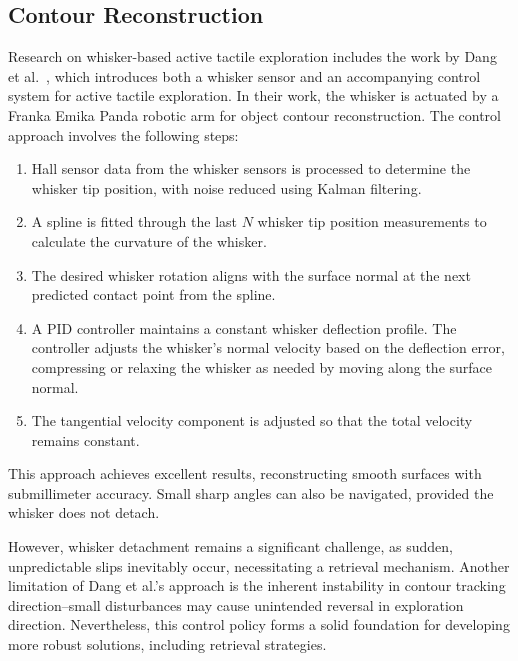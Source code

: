 \subsection{Contour Reconstruction}
Research on whisker-based active tactile exploration includes the work by Dang et al.~\cite{dang2025whisker}, which introduces both a whisker sensor and an accompanying control system for active tactile exploration.
In their work, the whisker is actuated by a Franka Emika Panda robotic arm for object contour reconstruction.
The control approach involves the following steps:
\begin{enumerate}
    \item Hall sensor data from the whisker sensors is processed to determine the whisker tip position, with noise reduced using Kalman filtering.
    \item A spline is fitted through the last $N$ whisker tip position measurements to calculate the curvature of the whisker.
    \item The desired whisker rotation aligns with the surface normal at the next predicted contact point from the spline.
    \item A PID controller maintains a constant whisker deflection profile.
    The controller adjusts the whisker’s normal velocity based on the deflection error, compressing or relaxing the whisker as needed by moving along the surface normal.
    \item The tangential velocity component is adjusted so that the total velocity remains constant.
\end{enumerate}

This approach achieves excellent results, reconstructing smooth surfaces with submillimeter accuracy.
Small sharp angles can also be navigated, provided the whisker does not detach.

However, whisker detachment remains a significant challenge, as sudden, unpredictable slips inevitably occur, necessitating a retrieval mechanism.
Another limitation of Dang et al.’s approach is the inherent instability in contour tracking direction--small disturbances may cause unintended reversal in exploration direction.
Nevertheless, this control policy forms a solid foundation for developing more robust solutions, including retrieval strategies.

